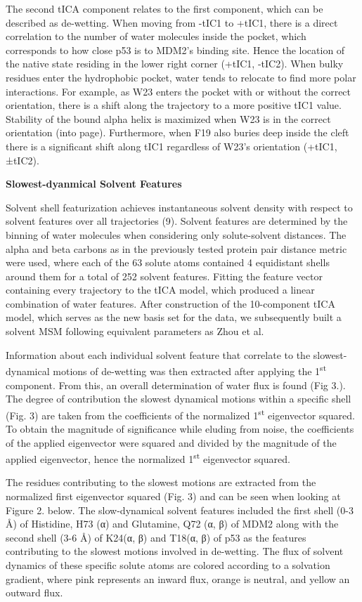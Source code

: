 The second tICA component relates to the first component, which can be
described as de-wetting. When moving from -tIC1 to +tIC1, there is a
direct correlation to the number of water molecules inside the pocket,
which corresponds to how close p53 is to MDM2's binding site. Hence the
location of the native state residing in the lower right corner (+tIC1,
-tIC2). When bulky residues enter the hydrophobic pocket, water tends to
relocate to find more polar interactions. For example, as W23 enters the
pocket with or without the correct orientation, there is a shift along
the trajectory to a more positive tIC1 value. Stability of the bound
alpha helix is maximized when W23 is in the correct orientation (into
page). Furthermore, when F19 also buries deep inside the cleft there is
a significant shift along tIC1 regardless of W23's orientation (+tIC1,
±tIC2).

\textbf{Slowest-dyanmical Solvent Features}

Solvent shell featurization achieves instantaneous solvent density with
respect to solvent features over all trajectories (9). Solvent features
are determined by the binning of water molecules when considering only
solute-solvent distances. The alpha and beta carbons as in the
previously tested protein pair distance metric were used, where each of
the 63 solute atoms contained 4 equidistant shells around them for a
total of 252 solvent features. Fitting the feature vector containing
every trajectory to the tICA model, which produced a linear combination
of water features. After construction of the 10-component tICA model,
which serves as the new basis set for the data, we subsequently built a
solvent MSM following equivalent parameters as Zhou et al.

Information about each individual solvent feature that correlate to the
slowest-dynamical motions of de-wetting was then extracted after
applying the 1\textsuperscript{st} component. From this, an overall
determination of water flux is found (Fig 3.). The degree of
contribution the slowest dynamical motions within a specific shell (Fig.
3) are taken from the coefficients of the normalized
1\textsuperscript{st} eigenvector squared. To obtain the magnitude of
significance while eluding from noise, the coefficients of the applied
eigenvector were squared and divided by the magnitude of the applied
eigenvector, hence the normalized 1\textsuperscript{st} eigenvector
squared.

The residues contributing to the slowest motions are extracted from the
normalized first eigenvector squared (Fig. 3) and can be seen when
looking at Figure 2. below. The slow-dynamical solvent features included
the first shell (0-3 Å) of Histidine, H73 (α) and Glutamine, Q72 (α, β)
of MDM2 along with the second shell (3-6 Å) of K24(α, β) and T18(α, β)
of p53 as the features contributing to the slowest motions involved in
de-wetting. The flux of solvent dynamics of these specific solute atoms
are colored according to a solvation gradient, where pink represents an
inward flux, orange is neutral, and yellow an outward flux.

